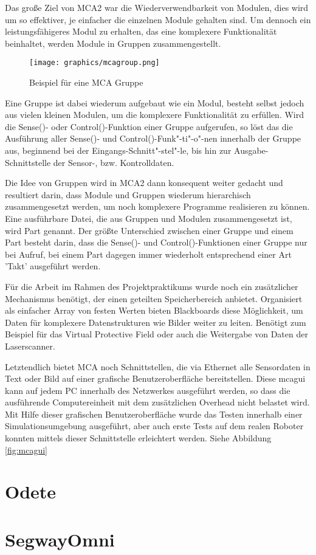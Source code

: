 Das große Ziel von MCA2 war die Wiederverwendbarkeit von Modulen, dies wird um so effektiver, je einfacher die einzelnen Module gehalten sind.
 Um dennoch ein leistungsfähigeres Modul zu erhalten, das eine komplexere Funktionalität beinhaltet, werden Module in Gruppen zusammengestellt. 

\begin{figure}[h]
	\center
	\texttt{[image: graphics/mcagroup.png]}
	\caption{\label{fig:MCA-Gruppe} Beispiel für eine MCA Gruppe}
\end{figure}

Eine Gruppe ist dabei wiederum aufgebaut wie ein Modul, besteht selbst jedoch aus vielen kleinen Modulen,
 um die komplexere Funktionalität zu erfüllen. Wird die Sense()- oder Control()-Funktion einer Gruppe aufgerufen,
 so löst das die Ausführung aller Sense()- und Control()-Funk"-ti"-o"-nen
 innerhalb der Gruppe aus, beginnend bei der Eingangs-Schnitt"-stel"-le, bis hin
 zur Ausgabe-Schnittstelle der Sensor-, bzw. Kontrolldaten.

Die Idee von Gruppen wird in MCA2 dann konsequent weiter gedacht und resultiert darin,
 dass Module und Gruppen wiederum hierarchisch zusammengesetzt werden, um noch komplexere Programme realisieren zu können.
 Eine ausführbare Datei, die aus Gruppen und Modulen zusammengesetzt ist, wird Part genannt.
 Der größte Unterschied zwischen einer Gruppe und einem Part besteht darin, dass die Sense()- und Control()-Funktionen einer Gruppe nur bei Aufruf,
 bei einem Part dagegen immer wiederholt entsprechend einer Art 'Takt' ausgeführt werden.

Für die Arbeit im Rahmen des Projektpraktikums wurde noch ein zusätzlicher Mechanismus benötigt,
 der einen geteilten Speicherbereich anbietet. Organisiert als einfacher Array von festen Werten bieten Blackboards diese Möglichkeit,
 um Daten für komplexere Datenstrukturen wie Bilder weiter zu leiten.
 Benötigt zum Beispiel für das Virtual Protective Field oder auch die Weitergabe von Daten der Laserscanner.

Letztendlich bietet MCA noch Schnittstellen, die via Ethernet alle Sensordaten in Text oder Bild auf einer grafische Benutzeroberfläche bereitstellen.
 Diese mcagui kann auf jedem PC innerhalb des Netzwerkes ausgeführt werden, so dass die ausführende Computereinheit
 mit dem zusätzlichen Overhead nicht belastet wird. Mit Hilfe dieser grafischen Benutzeroberfläche wurde das Testen
 innerhalb einer Simulationsumgebung ausgeführt, aber auch erste Tests auf dem realen Roboter konnten mittels dieser Schnittstelle erleichtert werden.
 Siehe Abbildung \ref{fig:mcagui} \citep{mca}


\section{Odete}
\authorsection{\editordirk}


\section{SegwayOmni}
\authorsection{\editordirk}

